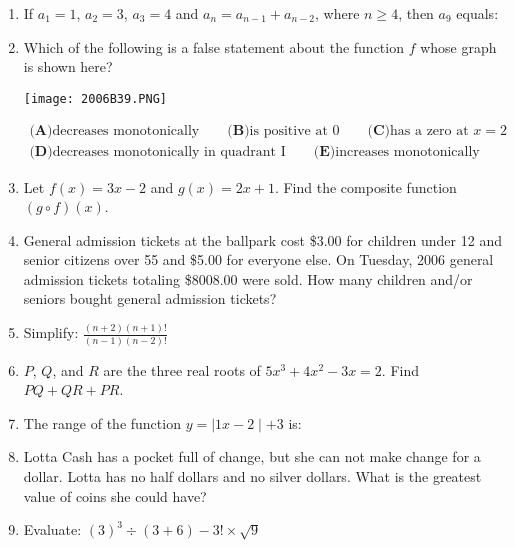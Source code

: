 \documentclass[../uilmath.tex]{subfiles}
\begin{document}
\begin{enumerate}[label=\bfseries\arabic*.]
        \item %
        If $a_1=1$, $a_2=3$, $a_3=4$ and $a_n = a_{n-1} + a_{n-2}$, where $n\geq 4$, then $a_9$ equals:

        \item %
        Which of the following is a false statement about the function $f$ whose graph is shown here?
        \begin{center}
            \texttt{[image: 2006B39.PNG]}
        \end{center}

        \begin{align*}
            \textbf{(A)} \text{decreases monotonically} \qquad \textbf{(B)} \text{is positive at 0}\qquad \textbf{(C)} \text{has a zero at $x=2$} \\
            \textbf{(D)} \text{decreases monotonically in quadrant I} \qquad \textbf{(E)} \text{increases monotonically}
        \end{align*}


        \item %
        Let $f(x)=3x-2$ and $g(x)=2x+1$. Find the composite function $(g\circ f)(x)$.

        \item %
        General admission tickets at the ballpark cost \$3.00 for children under 12 and senior citizens over 55 and 
        \$5.00 for everyone else. On Tuesday, 2006 general admission tickets totaling \$8008.00 were sold. How many children
        and/or seniors bought general admission tickets?

        \item %
        Simplify: $\frac{(n+2)(n+1)!}{(n-1)(n-2)!}$

        \item %
        $P$, $Q$, and $R$ are the three real roots of $5x^3+4x^2-3x=2$. Find $PQ+QR+PR$.

        \item %
        The range of the function $y=\mid 1x-2 \mid +3$ is: 

        \item %
        Lotta Cash has a pocket full of change, but she can not make change for a dollar. Lotta has no half dollars 
        and no silver dollars. What is the greatest value of coins she could have?

        \item %
        Evaluate: $(3)^3\div (3+6)-3!\times \sqrt{9}$


\end{enumerate}
\end{document}
